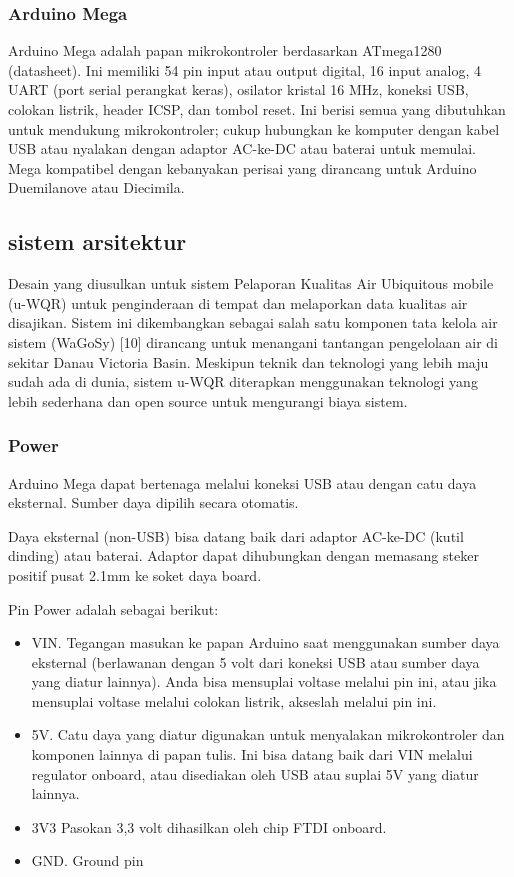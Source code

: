 \subsubsection{Arduino Mega}
Arduino Mega adalah papan mikrokontroler berdasarkan ATmega1280 (datasheet). Ini memiliki 54 pin input atau output digital, 16 input analog, 4 UART (port serial perangkat keras), osilator kristal 16 MHz, koneksi USB, colokan listrik, header ICSP, dan tombol reset. Ini berisi semua yang dibutuhkan untuk mendukung mikrokontroler; cukup hubungkan ke komputer dengan kabel USB atau nyalakan dengan adaptor AC-ke-DC atau baterai untuk memulai. Mega kompatibel dengan kebanyakan perisai yang dirancang untuk Arduino Duemilanove atau Diecimila.

\subsection{sistem arsitektur}
Desain yang diusulkan untuk sistem Pelaporan Kualitas Air Ubiquitous mobile (u-WQR) untuk penginderaan di tempat
dan melaporkan data kualitas air disajikan. Sistem ini dikembangkan sebagai salah satu komponen tata kelola air
sistem (WaGoSy) [10] dirancang untuk menangani tantangan pengelolaan air di sekitar Danau Victoria Basin.
Meskipun teknik dan teknologi yang lebih maju sudah ada di dunia, sistem u-WQR diterapkan
menggunakan teknologi yang lebih sederhana dan open source untuk mengurangi biaya sistem.

\subsubsection{Power}
Arduino Mega dapat bertenaga melalui koneksi USB atau dengan catu daya eksternal. Sumber daya dipilih secara otomatis.

Daya eksternal (non-USB) bisa datang baik dari adaptor AC-ke-DC (kutil dinding) atau baterai. Adaptor dapat dihubungkan dengan memasang steker positif pusat 2.1mm ke soket daya board.

Pin Power adalah sebagai berikut:
\begin{itemize}
\item VIN. Tegangan masukan ke papan Arduino saat menggunakan sumber daya eksternal (berlawanan dengan 5 volt dari koneksi USB atau sumber daya yang diatur lainnya). Anda bisa mensuplai voltase melalui pin ini, atau jika mensuplai voltase melalui colokan listrik, akseslah melalui pin ini.
\item 5V. Catu daya yang diatur digunakan untuk menyalakan mikrokontroler dan komponen lainnya di papan tulis. Ini bisa datang baik dari VIN melalui regulator onboard, atau disediakan oleh USB atau suplai 5V yang diatur lainnya.
\item 3V3 Pasokan 3,3 volt dihasilkan oleh chip FTDI onboard.
\item GND. Ground pin
\end{itemize}


